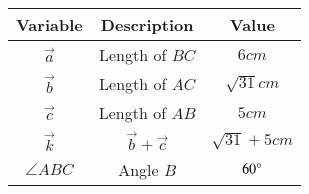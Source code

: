 \begin{center}
    \begin{tabular}{|c|c|c|} 
        \hline
            \textbf{Variable} & \textbf{Description} & \textbf{Value} \\ 
        \hline
            $\vec{a}$    & Length of $BC$      & $6cm$ \\ 
        \hline
            $\vec{b}$    & Length of $AC$ & $\sqrt{31}cm$\\ 
        \hline
            $\vec{c}$    & Length of $AB$ & $5cm$\\
        \hline
            $\vec{k}$    & $\vec{b} + \vec{c}$ & $\sqrt{31} + 5 cm$\\
        \hline
            $\angle{ABC}$& Angle $B$           & $60\degree$\\
        \hline
    \end{tabular}
\end{center}